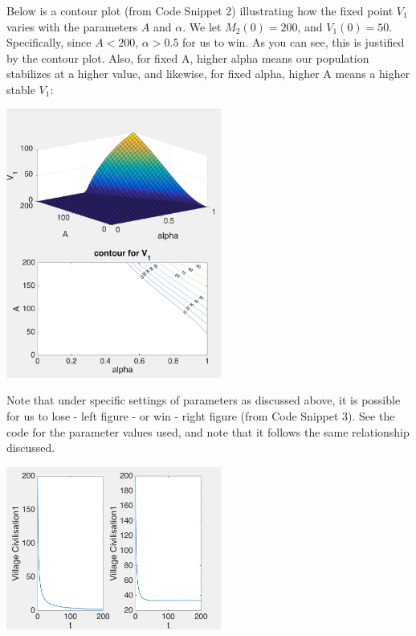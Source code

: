\documentclass[12pt]{article}
\begin{document}
Below is a contour plot (from Code Snippet 2) illustrating how the fixed point $V_1$ varies with the parameters $A$ and $\alpha$. We let $M_2(0) = 200$, and $V_1(0) = 50$. Specifically, since $A < 200$, $\alpha > 0.5$ for us to win. As you can see, this is justified by the contour plot. Also, for fixed A, higher alpha means our population stabilizes at a higher value, and likewise, for fixed alpha, higher A means a higher stable $V_1$:
\begin{center}
\includegraphics[width=200pt]{contourplot_basic}
\end{center}

Note that under specific settings of parameters as discussed above, it is possible for us to lose - left figure - or win - right figure (from Code Snippet 3). See the code for the parameter values used, and note that it follows the same relationship discussed.
\begin{center}
\includegraphics[width=200pt]{graph_basic}
\end{center}
\end{document}
